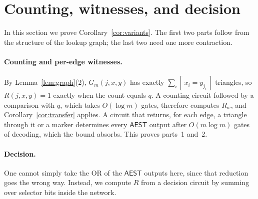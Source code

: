 \documentclass[11pt]{article}
\theoremstyle{definition}
\theoremstyle{remark}
\newcommand{\AEST}{\mathsf{AEST}}
\newcommand{\ind}[1]{[\,#1\,]}
\begin{document}
\section{Counting, witnesses, and decision}\label{sec:decision}

In this section we prove Corollary~\ref{cor:variants}. The first two
parts follow from the structure of the lookup graph; the last two need one
more contraction.

\paragraph{Counting and per-edge witnesses.} By Lemma~\ref{lem:graph}(2),
$G_m(j,x,y)$ has exactly $\sum_i\ind{x_i=y_{j_i}}$ triangles, so
$R(j,x,y)=1$ exactly when the count equals $q$. A counting circuit
followed by a comparison with $q$, which takes $O(\log m)$ gates,
therefore computes $R_w$, and Corollary~\ref{cor:transfer} applies. A
circuit that returns, for each edge, a triangle through it or a
marker determines every $\AEST$ output after $O(m\log m)$ gates of
decoding, which the bound absorbs. This proves parts~1 and~2.

\paragraph{Decision.} One cannot simply take the OR of the $\AEST$
outputs here, since that reduction goes the wrong way. Instead, we compute
$R$ from a decision circuit by summing over selector bits inside the
network.
\end{document}
